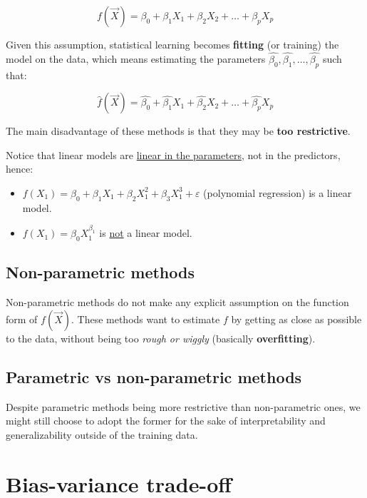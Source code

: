       $$f(\vec{X}) = \beta_0 + \beta_1 X_1 + \beta_2 X_2 + \dots + \beta_p X_p$$

      Given this assumption, statistical learning becomes \textbf{fitting} (or training) the model on the data, which means estimating the parameters $\hat{\beta_0}, \hat{\beta_1}, \dots, \hat{\beta_p}$ such that:

      $$\hat{f}(\vec{X}) = \hat{\beta_0} + \hat{\beta_1} X_1 + \hat{\beta_2} X_2 + \dots + \hat{\beta_p} X_p$$

      The main disadvantage of these methods is that they may be \textbf{too restrictive}.

      Notice that linear models are \underline{linear in the parameters}, not in the predictors, hence:
      \begin{itemize}
        \item $f(X_1) = \beta_0 + \beta_1 X_1 + \beta_2 X_1^2 + \beta_3 X_1^3 + \varepsilon$ (polynomial regression) is a linear model.
        \item $f(X_1) = \beta_0 X_1^{\beta_1}$ is \underline{not} a linear model.
      \end{itemize}

    \subsection{Non-parametric methods}
      Non-parametric methods do not make any explicit assumption on the function form of $f(\vec{X})$. These methods want to estimate $f$ by getting as close as possible to the data, without being too \textit{rough or wiggly} (basically \textbf{overfitting}).

    \subsection{Parametric vs non-parametric methods}
      Despite parametric methods being more restrictive than non-parametric ones, we might still choose to adopt the former for the sake of interpretability and generalizability outside of the training data. %

  \section{Bias-variance trade-off}

